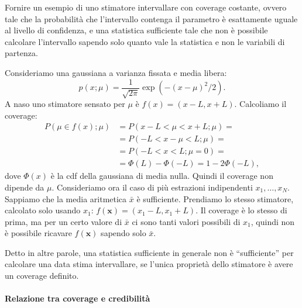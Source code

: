 \begin{exercise}
    Fornire un esempio di uno stimatore intervallare con coverage costante,
    ovvero tale che la probabilità che l'intervallo contenga il parametro è
    esattamente uguale al livello di confidenza, e una statistica sufficiente
    tale che non è possibile calcolare l'intervallo sapendo solo quanto vale
    la statistica e non le variabili di partenza.
\end{exercise}

\begin{solution}
    Consideriamo una gaussiana a varianza fissata e media libera:
    \begin{equation*}
        p(x;\mu) = \frac1{\sqrt{2\pi}}\exp(-(x-\mu)^2/2).
    \end{equation*}
    A naso uno stimatore sensato per $\mu$ è $f(x) = (x - L, x + L)$.
    Calcoliamo il coverage:
    \begin{align*}
        P(\mu \in f(x);\mu)
        &= P(x - L < \mu < x + L; \mu) = \\
        &= P(-L < x - \mu < L; \mu) = \\
        &= P(-L < x < L; \mu=0) = \\
        &= \Phi(L) - \Phi(-L)
        = 1 - 2\Phi(-L),
    \end{align*}
    dove $\Phi(x)$ è la cdf della gaussiana di media nulla. Quindi il coverage
    non dipende da $\mu$. Consideriamo ora il caso di più estrazioni
    indipendenti $x_1, \ldots, x_N$. Sappiamo che la media aritmetica $\bar x$
    è sufficiente. Prendiamo lo stesso stimatore, calcolato solo usando $x_1$:
    $f(\mathbf x) = (x_1 - L, x_1 + L)$. Il coverage è lo stesso di prima, ma
    per un certo valore di $\bar x$ ci sono tanti valori possibili di $x_1$,
    quindi non è possibile ricavare $f(\mathbf x)$ sapendo solo $\bar x$.
\end{solution}

Detto in altre parole, una statistica sufficiente in generale non è
``sufficiente'' per calcolare una data stima intervallare, se l'unica proprietà
dello stimatore è avere un coverage definito.

\paragraph{Relazione tra coverage e credibilità}

